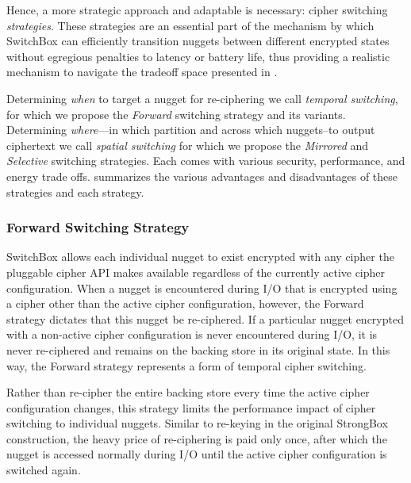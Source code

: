 Hence, a more strategic approach and adaptable is necessary: cipher switching
\emph{strategies}. These strategies are an essential part of the mechanism by
which SwitchBox can efficiently transition nuggets between different encrypted
states without egregious penalties to latency or battery life, thus providing a
realistic mechanism to navigate the tradeoff space presented in
.

Determining \emph{when} to target a nugget for re-ciphering we call
\emph{temporal switching}, for which we propose the \emph{Forward} switching
strategy and its variants. Determining \emph{where}---in which partition and
across which nuggets--to output ciphertext we call \emph{spatial switching} for
which we propose the \emph{Mirrored} and \emph{Selective} switching strategies.
Each comes with various security, performance, and energy trade offs.
 summarizes the various advantages and
disadvantages of these strategies and each strategy.  

\subsubsection{Forward Switching Strategy}

SwitchBox allows each individual nugget to exist encrypted with any cipher the
pluggable cipher API makes available regardless of the currently active cipher
configuration. When a nugget is encountered during I/O that is encrypted using a
cipher other than the active cipher configuration, however, the Forward strategy
dictates that this nugget be re-ciphered. If a particular nugget encrypted with
a non-active cipher configuration is never encountered during I/O, it is never
re-ciphered and remains on the backing store in its original state. In this way,
the Forward strategy represents a form of temporal cipher switching.

Rather than re-cipher the entire backing store every time the active cipher
configuration changes, this strategy limits the performance impact of cipher
switching to individual nuggets. Similar to re-keying in the original StrongBox
construction, the heavy price of re-ciphering is paid only once, after which the
nugget is accessed normally during I/O until the active cipher configuration is
switched again.

